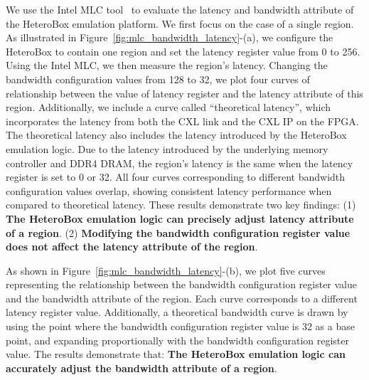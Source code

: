 We use the Intel MLC tool~\cite{mlc} to evaluate the latency and bandwidth attribute of the HeteroBox emulation platform. We first focus on the case of a single region. As illustrated in Figure~\ref{fig:mlc_bandwidth_latency}-(a), we configure the HeteroBox to contain one region and set the latency register value from 0 to 256. Using the Intel MLC, we then measure the region’s latency.
Changing the bandwidth configuration values from 128 to 32, we plot four curves of relationship between the value of latency register and the latency attribute of this region. Additionally, we include a curve called “theoretical latency”, which incorporates the latency from both the CXL link and the CXL IP on the FPGA. 
The theoretical latency also includes the latency introduced by the HeteroBox emulation logic. 
Due to the latency introduced by the underlying memory controller and DDR4 DRAM, the region's latency is the same when the latency register is set to 0 or 32.
All four curves corresponding to different bandwidth configuration values overlap, showing consistent latency performance when compared to theoretical latency.
These results demonstrate two key findings: (1) \textbf{The HeteroBox emulation logic can precisely adjust latency attribute of a region}. (2) \textbf{Modifying the bandwidth configuration register value does not affect the latency attribute of the region}.

As shown in Figure~\ref{fig:mlc_bandwidth_latency}-(b), we plot five curves representing the relationship between the bandwidth configuration register value and the bandwidth attribute of the region. Each curve corresponds to a different latency register value. Additionally, a theoretical bandwidth curve is drawn by using the point where the bandwidth configuration register value is 32 as a base point, and expanding proportionally with the bandwidth configuration register value.
The results demonstrate that: \textbf{The HeteroBox emulation logic can accurately adjust the bandwidth attribute of a region}.

